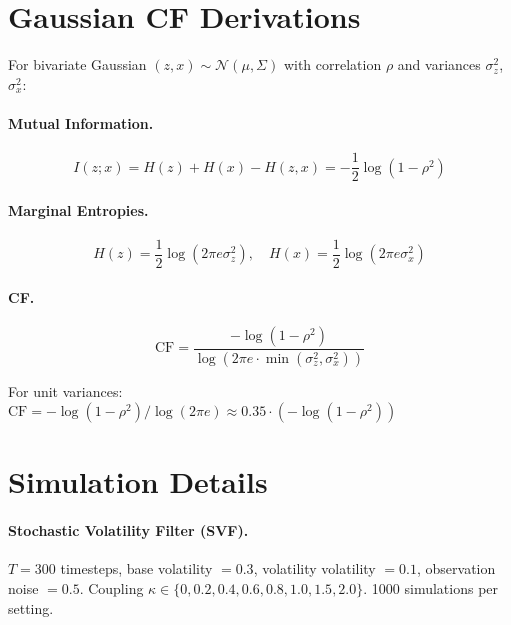 \documentclass[10pt]{article} %
\theoremstyle{plain}
\theoremstyle{definition}
\newcommand{\CF}{\mathrm{CF}}
\newcommand{\MI}{I}
\newcommand{\Ent}{H}
\begin{document}
\appendix

\section{Gaussian CF Derivations}
\label{app:gaussian}

For bivariate Gaussian $(z, x) \sim \mathcal{N}(\mu, \Sigma)$ with correlation $\rho$ and variances $\sigma_z^2$, $\sigma_x^2$:

\paragraph{Mutual Information.}
\begin{equation}
\MI(z;x) = \Ent(z) + \Ent(x) - \Ent(z,x) = -\frac{1}{2}\log(1 - \rho^2)
\end{equation}

\paragraph{Marginal Entropies.}
\begin{equation}
\Ent(z) = \frac{1}{2}\log(2\pi e \sigma_z^2), \quad \Ent(x) = \frac{1}{2}\log(2\pi e \sigma_x^2)
\end{equation}

\paragraph{CF.}
\begin{equation}
\CF = \frac{-\log(1-\rho^2)}{\log(2\pi e \cdot \min(\sigma_z^2, \sigma_x^2))}
\end{equation}

For unit variances: $\CF = -\log(1-\rho^2) / \log(2\pi e) \approx 0.35 \cdot (-\log(1-\rho^2))$

\section{Simulation Details}
\label{app:simulations}

\paragraph{Stochastic Volatility Filter (SVF).} $T = 300$ timesteps, base volatility $= 0.3$, volatility volatility $= 0.1$, observation noise $= 0.5$. Coupling $\kappa \in \{0, 0.2, 0.4, 0.6, 0.8, 1.0, 1.5, 2.0\}$. 1000 simulations per setting.
\end{document}
